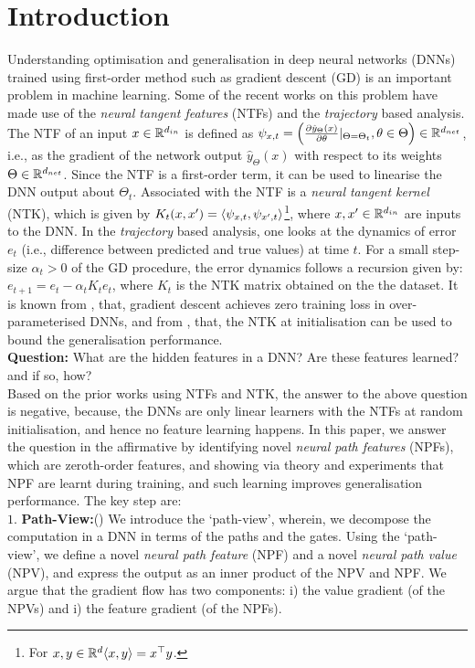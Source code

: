 \section{Introduction}
Understanding optimisation and generalisation in deep neural networks (DNNs) trained using first-order method such as gradient descent (GD) is an important problem in machine learning. Some of the recent works on this problem have made use of the \emph{neural tangent features} (NTFs) and the \emph{trajectory} based analysis. The NTF of an input $x\in \mathbb{R}^{d_{in}}$ is defined as $\psi_{x,t}=\left(\frac{\partial \hat{y}_{\Theta}(x)}{\partial \theta}|_{\Theta=\Theta_t},\theta \in \Theta\right)\in \mathbb{R}^{d_{net}}$, i.e., as the gradient of the network output $\hat{y}_{\Theta}(x)$ with respect to its weights $\Theta\in\mathbb{R}^{d_{net}}$. Since the NTF is a first-order term, it can be used to linearise the DNN output about $\Theta_t$. Associated with the NTF is a \emph{neural tangent kernel} (NTK), which is given by $K_t(x,x')=\langle \psi_{x,t},\psi_{x',t}\rangle$\footnote{For $x,y\in\mathbb{R}^d \langle x,y\rangle=x^\top y$.}, where $x,x'\in\mathbb{R}^{d_{in}}$ are inputs to the DNN. In the \emph{trajectory} based analysis, one looks at the dynamics of error $e_t$  (i.e., difference between predicted and true values) at time $t$. For a small step-size $\alpha_t>0$ of the GD procedure, the error dynamics follows a recursion given by: $e_{t+1}=e_t-\alpha_tK_te_t$, where $K_t$ is the NTK matrix obtained on the the dataset. It is known from \cite{dudnn}, that, gradient descent achieves zero training loss in over-parameterised DNNs, and from \cite{cao2019generalization}, that, the NTK at initialisation can be used to bound the generalisation performance.\\
\textbf{Question:} What are the hidden features in a DNN? Are these features learned? and if so, how?\\
Based on the prior works using NTFs and NTK, the answer to the above question is negative, because, the DNNs are only linear learners with the NTFs at random initialisation, and hence no feature learning happens. In this paper, we answer the question in the affirmative by identifying novel \emph{neural path features} (NPFs), which are zeroth-order features, and showing via theory and experiments that NPF are learnt during training, and such learning improves generalisation performance. The key step are:\\
$1.$ \textbf{Path-View:}() We introduce the `path-view', wherein, we decompose the computation in a DNN in terms of the paths and the gates. Using the `path-view', we define a novel \emph{neural path feature} (NPF) and a novel \emph{neural path value} (NPV), and express the output as an inner product of the NPV and NPF. We argue that the gradient flow has two components: i) the value gradient (of the NPVs)  and i) the feature gradient (of the NPFs).\\
